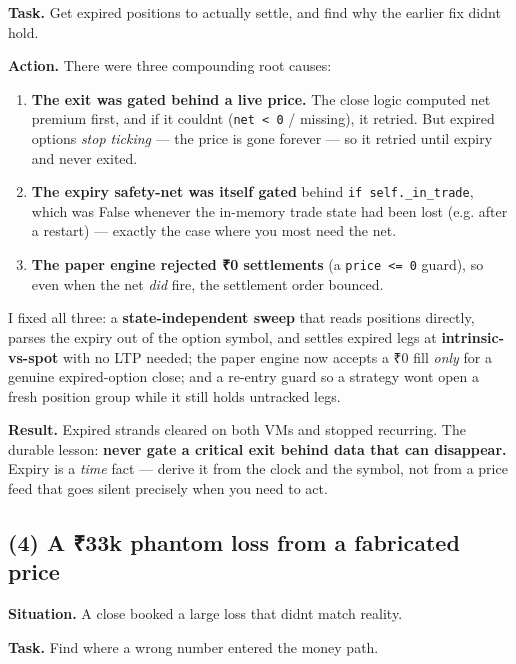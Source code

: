 \documentclass[11pt]{article}
\providecommand{\tightlist}{\setlength{\itemsep}{1pt}\setlength{\parskip}{0pt}}
\begin{document}
\textbf{Task.} Get expired positions to actually settle, and find why the earlier fix didn\textquotesingle t hold.

\textbf{Action.} There were three compounding root causes:

\begin{enumerate}
\def\labelenumi{\arabic{enumi}.}
\tightlist
\item
  \textbf{The exit was gated behind a live price.} The close logic computed net premium first, and
  if it couldn\textquotesingle t (\texttt{net\ \textless{}\ 0} / missing), it retried. But expired options \emph{stop ticking} --- the
  price is gone forever --- so it retried until expiry and never exited.
\item
  \textbf{The expiry safety-net was itself gated} behind \texttt{if\ self.\_in\_trade}, which was False
  whenever the in-memory trade state had been lost (e.g. after a restart) --- exactly the case
  where you most need the net.
\item
  \textbf{The paper engine rejected ₹0 settlements} (a \texttt{price\ \textless{}=\ 0} guard), so even when the net
  \emph{did} fire, the settlement order bounced.
\end{enumerate}

I fixed all three: a \textbf{state-independent sweep} that reads positions directly, parses the
expiry out of the option symbol, and settles expired legs at \textbf{intrinsic-vs-spot} with no LTP
needed; the paper engine now accepts a ₹0 fill \emph{only} for a genuine expired-option close; and a
re-entry guard so a strategy won\textquotesingle t open a fresh position group while it still holds untracked
legs.

\textbf{Result.} Expired strands cleared on both VMs and stopped recurring. The durable lesson:
\textbf{never gate a critical exit behind data that can disappear.} Expiry is a \emph{time} fact --- derive
it from the clock and the symbol, not from a price feed that goes silent precisely when you need
to act.

\subsection{(4) A ₹33k phantom loss from a fabricated price}\label{4-a-33k-phantom-loss-from-a-fabricated-price}

\textbf{Situation.} A close booked a large loss that didn\textquotesingle t match reality.

\textbf{Task.} Find where a wrong number entered the money path.
\end{document}
